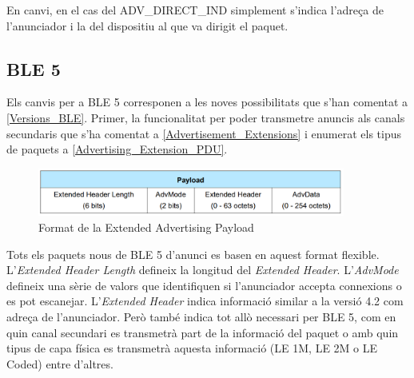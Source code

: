 En canvi, en el cas del ADV\_DIRECT\_IND simplement s'indica l'adreça de l'anunciador i la del dispositiu al que va dirigit el paquet.

\subsection{BLE 5}
Els canvis per a BLE 5 corresponen a les noves possibilitats que s'han comentat a \ref{Versions_BLE}.
Primer, la funcionalitat per poder transmetre anuncis als canals secundaris que s'ha comentat a \ref{Advertisement_Extensions} i enumerat els tipus de paquets a \ref{Advertising_Extension_PDU}.

\begin{figure}[!h]
	\begin{center}
		\includegraphics[width=0.9\textwidth]{./images/Common_Extended_Advertising_Payload_Format.png}
		\caption{Format de la Extended Advertising Payload \cite{BLE_5_Extended_Advertising}}
	\end{center}
\end{figure}

Tots els paquets nous de BLE 5 d'anunci es basen en aquest format flexible.
L'\textit{Extended Header Length} defineix la longitud del \textit{Extended Header}.
L'\textit{AdvMode} defineix una sèrie de valors que identifiquen si l'anunciador accepta connexions o es pot escanejar.
L'\textit{Extended Header} indica informació similar a la versió 4.2 com adreça de l'anunciador.
Però també indica tot allò necessari per BLE 5, com en quin canal secundari es transmetrà part de la informació del paquet o amb quin tipus de capa física es transmetrà aquesta informació (LE 1M, LE 2M o LE Coded) entre d'altres.

